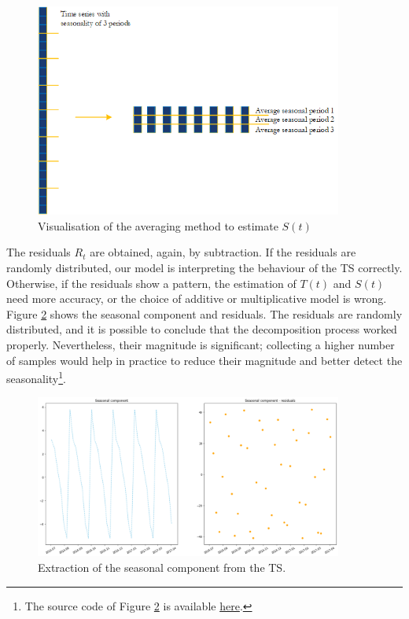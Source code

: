 \begin{figure}[hbt!]
\centering
\includegraphics[width=0.9\textwidth]{SectionLetsMath/elemStat_figures/fig_averaging.png}
\captionsetup{type=figure}
\caption{Visualisation of the averaging method to estimate $S(t)$}
\label{fig_averaging}
\end{figure}

The residuals $R_t$ are obtained, again, by subtraction. If the residuals are randomly distributed, our model is interpreting the behaviour of the TS correctly. Otherwise, if the residuals show a pattern,  the estimation of $T(t)$ and $S(t)$ need more accuracy, or the choice of additive or multiplicative model is wrong. Figure \ref{fig_extractedSeasonality} shows the seasonal component and residuals. The residuals are randomly distributed, and it is possible to conclude that the decomposition process worked properly. Nevertheless, their magnitude is significant; collecting a higher number of samples would help in practice to reduce their magnitude and better detect the seasonality\footnote{The source code of Figure \ref{fig_extractedSeasonality} is available \href{https://github.com/aletuf93/logproj/blob/master/examples/03.\%20Statistics.ipynb}{here}.}.

\begin{figure}[hbt!]
\centering
\includegraphics[width=0.9\textwidth]{SectionLetsMath/elemStat_figures/fig_extractedSeasonality.png}
\captionsetup{type=figure}
\caption{Extraction of the seasonal component from the TS.}
\label{fig_extractedSeasonality}
\end{figure}

